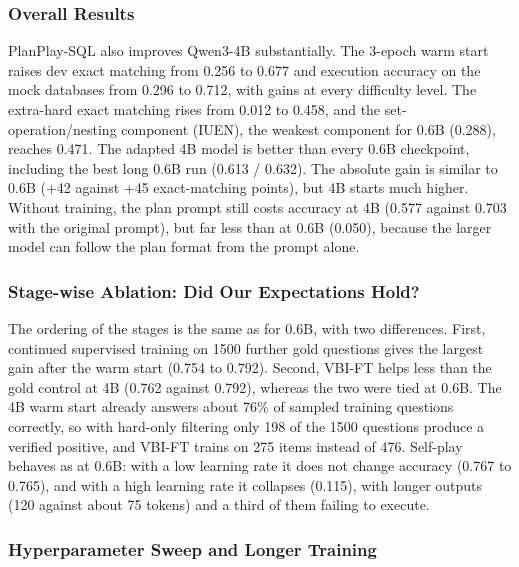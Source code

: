\subsubsection{Overall Results}

PlanPlay-SQL also improves Qwen3-4B substantially. The 3-epoch warm start raises dev exact matching from 0.256 to 0.677 and execution accuracy on the mock databases from 0.296 to 0.712, with gains at every difficulty level. The extra-hard exact matching rises from 0.012 to 0.458, and the set-operation/nesting component (IUEN), the weakest component for 0.6B (0.288), reaches 0.471. The adapted 4B model is better than every 0.6B checkpoint, including the best long 0.6B run (0.613 / 0.632). The absolute gain is similar to 0.6B (+42 against +45 exact-matching points), but 4B starts much higher. Without training, the plan prompt still costs accuracy at 4B (0.577 against 0.703 with the original prompt), but far less than at 0.6B (0.050), because the larger model can follow the plan format from the prompt alone.

\subsubsection{Stage-wise Ablation: Did Our Expectations Hold?}

The ordering of the stages is the same as for 0.6B, with two differences. First, continued supervised training on 1500 further gold questions gives the largest gain after the warm start (0.754 to 0.792). Second, VBI-FT helps less than the gold control at 4B (0.762 against 0.792), whereas the two were tied at 0.6B. The 4B warm start already answers about 76\% of sampled training questions correctly, so with hard-only filtering only 198 of the 1500 questions produce a verified positive, and VBI-FT trains on 275 items instead of 476. Self-play behaves as at 0.6B: with a low learning rate it does not change accuracy (0.767 to 0.765), and with a high learning rate it collapses (0.115), with longer outputs (120 against about 75 tokens) and a third of them failing to execute.

\subsubsection{Hyperparameter Sweep and Longer Training}


